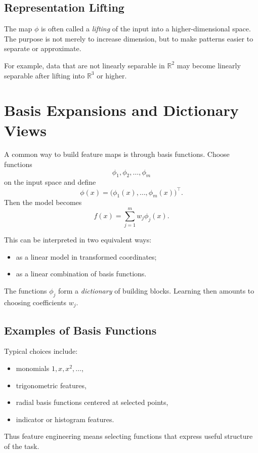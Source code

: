 \subsection{Representation Lifting}

The map $\phi$ is often called a \emph{lifting} of the input into a higher-dimensional space. The purpose is not merely to increase dimension, but to make patterns easier to separate or approximate.

For example, data that are not linearly separable in $\mathbb R^2$ may become linearly separable after lifting into $\mathbb R^3$ or higher.

\section{Basis Expansions and Dictionary Views}

A common way to build feature maps is through basis functions. Choose functions
\[
\phi_1,\phi_2,\dots,\phi_m
\]
on the input space and define
\[
\phi(x)=\big(\phi_1(x),\dots,\phi_m(x)\big)^\top.
\]
Then the model becomes
\[
f(x)=\sum_{j=1}^m w_j \phi_j(x).
\]

This can be interpreted in two equivalent ways:
\begin{itemize}
    \item as a linear model in transformed coordinates;
    \item as a linear combination of basis functions.
\end{itemize}

The functions $\phi_j$ form a \emph{dictionary} of building blocks. Learning then amounts to choosing coefficients $w_j$.

\subsection{Examples of Basis Functions}

Typical choices include:
\begin{itemize}
    \item monomials $1,x,x^2,\dots$,
    \item trigonometric features,
    \item radial basis functions centered at selected points,
    \item indicator or histogram features.
\end{itemize}

Thus feature engineering means selecting functions that express useful structure of the task.

